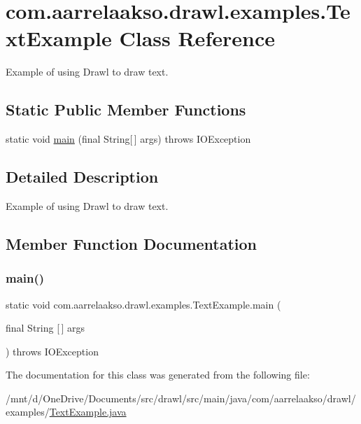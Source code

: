 \hypertarget{classcom_1_1aarrelaakso_1_1drawl_1_1examples_1_1_text_example}{}\section{com.\+aarrelaakso.\+drawl.\+examples.\+Text\+Example Class Reference}
\label{classcom_1_1aarrelaakso_1_1drawl_1_1examples_1_1_text_example}


Example of using Drawl to draw text.  


\subsection*{Static Public Member Functions}
\begin{DoxyCompactItemize}
\item 
static void \hyperlink{classcom_1_1aarrelaakso_1_1drawl_1_1examples_1_1_text_example_ab38db57a7c92943a935255463fea0214}{main} (final String\mbox{[}$\,$\mbox{]} args)  throws I\+O\+Exception 
\end{DoxyCompactItemize}


\subsection{Detailed Description}
Example of using Drawl to draw text. 

\subsection{Member Function Documentation}
\mbox{\label{classcom_1_1aarrelaakso_1_1drawl_1_1examples_1_1_text_example_ab38db57a7c92943a935255463fea0214}} 
\subsubsection{\texorpdfstring{main()}{main()}}
{\footnotesize\ttfamily static void com.\+aarrelaakso.\+drawl.\+examples.\+Text\+Example.\+main (\begin{DoxyParamCaption}\item[{final String \mbox{[}$\,$\mbox{]}}]{args }\end{DoxyParamCaption}) throws I\+O\+Exception\hspace{0.3cm}{\ttfamily [static]}}



The documentation for this class was generated from the following file\+:\begin{DoxyCompactItemize}
\item 
/mnt/d/\+One\+Drive/\+Documents/src/drawl/src/main/java/com/aarrelaakso/drawl/examples/\hyperlink{_text_example_8java}{Text\+Example.\+java}\end{DoxyCompactItemize}
